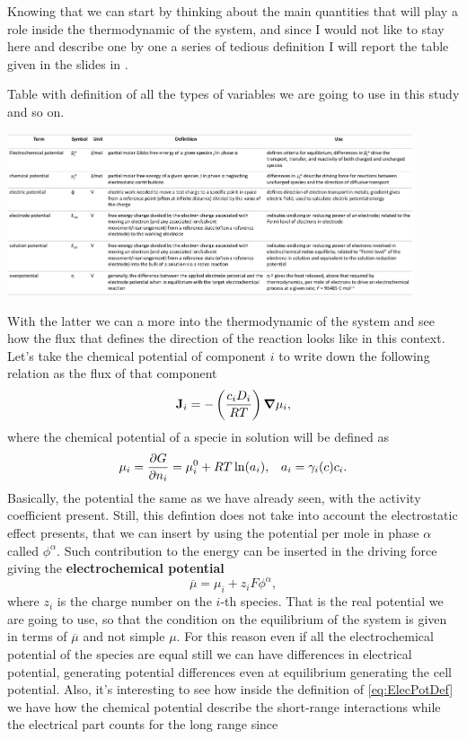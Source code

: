 Knowing that we can start by thinking about the main quantities that will play a role inside the thermodynamic of the system, and since I would not like to stay here and describe one by one a series of tedious definition I will report the table given in the slides in .
\begin{table}[t]
    \caption{
        Table with definition of all the types of variables we are going to use in this study and so on.
    }
    \label{tab:Def}
    \centering
    \includegraphics[width=0.9\textwidth]{Immagini/TabDef.png}
\end{table}
With the latter we can a more into the thermodynamic of the system and see how the flux that defines the direction of the reaction looks like in this context. Let's take the chemical potential of component $i$ to write down the following relation as the flux of that component
\begin{equation}
    \vb{J}_i = -\left( \frac{c_iD_i}{RT} \right)\grad \mu_i,
\end{equation}
where the chemical potential of a specie in solution will be defined as
\begin{align}
    &\mu_i = \pdv{G}{n_i} = \mu^0_i + RT\ln(a_i), &a_i = \gamma_i(c) c_i.
\end{align}
Basically, the potential the same as we have already seen, with the activity coefficient present. Still, this defintion does not take into account the electrostatic effect presents, that we can insert by using the potential per mole in phase $\alpha$ called $\phi^\alpha$. Such contribution to the energy can be inserted in the driving force giving the \textbf{electrochemical potential}
\begin{equation}
    \label{eq:ElecPotDef}
    \overline{\mu} = \mu_i + z_i F \phi^\alpha,
\end{equation}
where $z_i$ is the charge number on the $i$-th species. That is the real potential we are going to use, so that the condition on the equilibrium of the system is given in terms of $\overline{\mu}$ and not simple $\mu$. For this reason even if all the electrochemical potential of the species are equal still we can have differences in electrical potential, generating potential differences even at equilibrium generating the cell potential. Also, it's interesting to see how inside the definition of \eqref{eq:ElecPotDef} we have how the chemical potential describe the short-range interactions while the electrical part counts for the long range since
